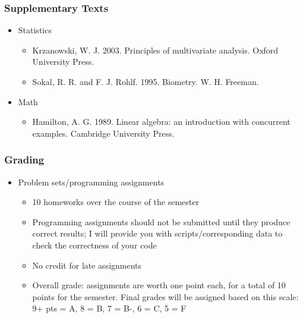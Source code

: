 \documentclass{beamer}
\begin{document}
\begin{frame}
  \frametitle{Supplementary Texts}
\begin{itemize}


\item Statistics
\begin{itemize}
	\item Krzanowski, W. J. 2003. Principles of multivariate analysis. Oxford University Press.
	\item Sokal, R. R. and F. J. Rohlf. 1995. Biometry. W. H. Freeman.
\end{itemize}

\item Math
\begin{itemize}
	\item Hamilton, A. G. 1989. Linear algebra: an introduction with concurrent examples. Cambridge University Press.	
\end{itemize}

\end{itemize}

\end{frame}

\begin{frame}
  \frametitle{Grading}
\begin{itemize}
\item Problem sets/programming assignments
\begin{itemize}
	\item 10 homeworks over the course of the semester
	\item Programming assignments should not be submitted until they produce correct results; I will provide you with scripts/corresponding data to check the correctness of your code
	\item No credit for late assignments
	\item Overall grade: assignments are worth one point each, for a total of 10 points for the semester. \alert{Final grades will be assigned based on this scale: 9+ pts = A, 8 = B, 7 = B-, 6 = C, 5 = F}
\end{itemize}

\end{itemize}

\end{frame}
\end{document}
